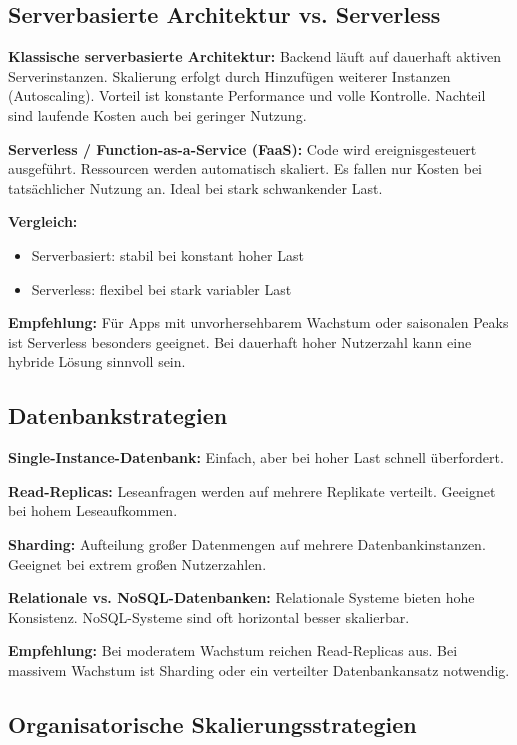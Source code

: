 \subsection{Serverbasierte Architektur vs. Serverless}

\textbf{Klassische serverbasierte Architektur:}  
Backend läuft auf dauerhaft aktiven Serverinstanzen. Skalierung erfolgt durch Hinzufügen weiterer Instanzen (Autoscaling). Vorteil ist konstante Performance und volle Kontrolle. Nachteil sind laufende Kosten auch bei geringer Nutzung.

\textbf{Serverless / Function-as-a-Service (FaaS):}  
Code wird ereignisgesteuert ausgeführt. Ressourcen werden automatisch skaliert. Es fallen nur Kosten bei tatsächlicher Nutzung an. Ideal bei stark schwankender Last.

\textbf{Vergleich:}

\begin{itemize}
\item Serverbasiert: stabil bei konstant hoher Last
\item Serverless: flexibel bei stark variabler Last
\end{itemize}

\textbf{Empfehlung:}  
Für Apps mit unvorhersehbarem Wachstum oder saisonalen Peaks ist Serverless besonders geeignet. Bei dauerhaft hoher Nutzerzahl kann eine hybride Lösung sinnvoll sein.

\subsection{Datenbankstrategien}

\textbf{Single-Instance-Datenbank:}  
Einfach, aber bei hoher Last schnell überfordert.

\textbf{Read-Replicas:}  
Leseanfragen werden auf mehrere Replikate verteilt. Geeignet bei hohem Leseaufkommen.

\textbf{Sharding:}  
Aufteilung großer Datenmengen auf mehrere Datenbankinstanzen. Geeignet bei extrem großen Nutzerzahlen.

\textbf{Relationale vs. NoSQL-Datenbanken:}  
Relationale Systeme bieten hohe Konsistenz. NoSQL-Systeme sind oft horizontal besser skalierbar.

\textbf{Empfehlung:}  
Bei moderatem Wachstum reichen Read-Replicas aus. Bei massivem Wachstum ist Sharding oder ein verteilter Datenbankansatz notwendig.

\subsection{Organisatorische Skalierungsstrategien}

